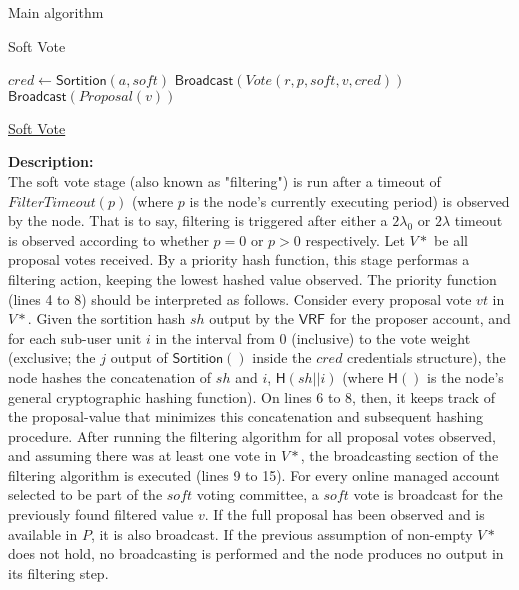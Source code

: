 \documentclass[10pt,a4paper]{article}
\begin{document}
\begin{section}{Main algorithm}
\begin{subsection}{Soft Vote}
\begin{algorithm}[H]
\begin{algorithmic}[1]
            \State $cred \gets \mathsf{Sortition}(a, soft)$
                \State $\mathsf{Broadcast}(Vote(r, p, soft, v, cred))$
                    \State $\mathsf{Broadcast}(Proposal(v))$
                \EndIf
            \EndIf
        \EndFor
    \EndIf

    \EndFunction
    \end{algorithmic}
    \caption{\underline{Soft Vote}}
\end{algorithm}

\noindent \textbf{Description:}\\
The soft vote stage (also known as "filtering") is run after a timeout of $FilterTimeout(p)$
(where $p$ is the node's currently executing period) is observed by the node. That is to say, filtering
is triggered after either a $2\lambda_0$ or $2\lambda$ timeout is observed according to whether $p=0$ or $p>0$ respectively.
Let $V*$ be all proposal votes received. By a priority hash function, this stage performas a filtering action,
keeping the lowest hashed value observed.
The priority function (lines 4 to 8) should be interpreted as follows. Consider every proposal vote $vt$ in $V*$.
Given the sortition hash $sh$ output by the $\mathsf{VRF}$ for the proposer account, and for each sub-user unit $i$ 
in the interval from $0$ (inclusive) to the vote weight (exclusive; the $j$ output of $\mathsf{Sortition}()$ inside 
the $cred$ credentials structure), the node hashes the concatenation of $sh$ and $i$, $\mathsf{H}(sh||i)$ 
(where $\mathsf{H}()$ is the node's general cryptographic hashing function). On lines 6 to 8, 
then, it keeps track of the proposal-value that minimizes this concatenation and subsequent hashing procedure.
After running the filtering algorithm for all proposal votes observed, and assuming there was at least one vote
in $V*$, the broadcasting section of the filtering algorithm is executed (lines 9 to 15).
For every online managed account selected to be part of the $soft$ voting committee, a $soft$ vote is
broadcast for the previously found filtered value $v$. If the full proposal has been observed and is available in $P$,
it is also broadcast. 
If the previous assumption of non-empty $V*$ does not hold, no broadcasting is performed and the node produces no
output in its filtering step.

\end{subsection}



\end{section}
\end{document}
